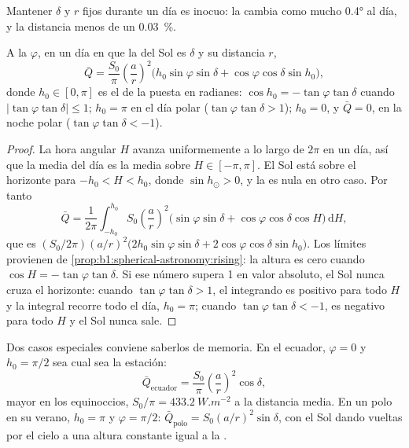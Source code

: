 Mantener $\delta$ y $r$ fijos durante un día es inocuo: la  cambia como mucho \ang{0.4} al día, y la distancia menos de un \qty{0.03}{\percent}.

\begin{theorem}\label{thm:b1:radiation-heat-transport:daily}
A la  $\varphi$, en un día en que la  del Sol es $\delta$ y su distancia $r$,
\[
  \bar Q = \frac{S_0}{\pi}\left(\frac{a}{r}\right)^{2}
  \bigl(h_0\sin\varphi\sin\delta + \cos\varphi\cos\delta\sin h_0\bigr),
\]
donde $h_0 \in [0, \pi]$ es el  de la puesta en radianes: $\cos h_0 =
-\tan\varphi\tan\delta$ cuando $|\tan\varphi\tan\delta| \le 1$; $h_0 = \pi$ en el día
polar ($\tan\varphi\tan\delta > 1$); $h_0 = 0$, y $\bar Q = 0$, en la noche
polar ($\tan\varphi\tan\delta < -1$).
\end{theorem}

\begin{proof}
La hora angular $H$ avanza uniformemente a lo largo de $2\pi$ en un día, así que la media del día es la media sobre $H \in [-\pi, \pi]$. El Sol está sobre el horizonte para $-h_0 < H < h_0$,
donde $\sin h_\odot > 0$, y la  es nula en otro caso. Por tanto
\[
  \bar Q = \frac{1}{2\pi}\int_{-h_0}^{h_0} S_0\left(\frac{a}{r}\right)^{2}
  \bigl(\sin\varphi\sin\delta + \cos\varphi\cos\delta\cos H\bigr)\,\mathrm dH ,
\]
que es $(S_0/2\pi)(a/r)^2\bigl(2h_0\sin\varphi\sin\delta +
2\cos\varphi\cos\delta\sin h_0\bigr)$.
Los límites provienen de \cref{prop:b1:spherical-astronomy:rising}: la altura es cero cuando $\cos H = -\tan\varphi\tan\delta$. Si ese número supera 1 en valor absoluto, el Sol nunca cruza el horizonte: cuando $\tan\varphi\tan\delta > 1$, el integrando es positivo para todo $H$ y la integral recorre todo el día, $h_0 = \pi$; cuando $\tan\varphi\tan\delta < -1$, es negativo para todo $H$ y el Sol nunca sale.
\end{proof}

Dos casos especiales conviene saberlos de memoria. En el ecuador, $\varphi = 0$ y
$h_0 = \pi/2$ sea cual sea la estación:
\[
  \bar Q_\text{ecuador} = \frac{S_0}{\pi}\left(\frac{a}{r}\right)^{2}\cos\delta ,
\]
mayor en los equinoccios, $S_0/\pi = \qty{433.2}{W.m^{-2}}$ a la distancia media.
En un polo en su verano, $h_0 = \pi$ y $\varphi = \pi/2$: $\bar Q_\text{polo} =
S_0(a/r)^2\sin\delta$, con el Sol dando vueltas por el cielo a una altura constante igual a la .

